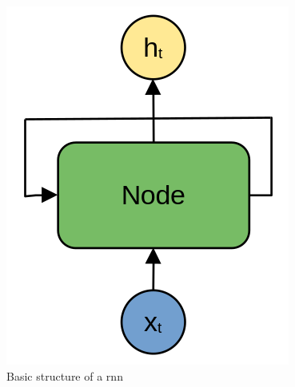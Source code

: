 \begin{figure}
    \centering
    \includegraphics[scale=0.25]{images/rnn_basic.png}
    \caption{Basic structure of a \acrshort{rnn}}
    \label{fig:rnn_basic}
\end{figure}

